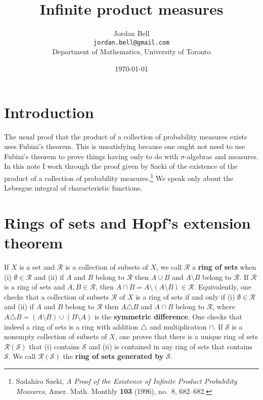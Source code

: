 \documentclass{article}
\theoremstyle{definition}
\begin{document}
\title{Infinite product measures}
\author{Jordan Bell\\ \texttt{jordan.bell@gmail.com}\\Department of Mathematics, University of Toronto}
\date{\today}

\maketitle

\section{Introduction}
The usual proof that the product of a collection of probability measures exists uses Fubini's theorem. This is unsatisfying because one ought not need to use Fubini's theorem
to prove things having only to do with $\sigma$-algebras and measures. In this note I work through the proof given by Saeki of the existence of the product of a collection
of probability measures.\footnote{Sadahiro Saeki, {\em A Proof of the Existence of Infinite Product Probability Measures}, Amer. Math. Monthly \textbf{103} (1996), no.~8, 682--682.}
 We  speak only about the Lebesgue integral of characteristic functions.

\section{Rings of sets and Hopf's extension theorem}
If $X$ is a set and $\mathscr{R}$ is a collection of subsets of $X$, we call $\mathscr{R}$ a \textbf{ring of sets} when
(i) $\emptyset \in \mathscr{R}$ and (ii) if $A$ and $B$ belong to $\mathscr{R}$ then $A \cup B$ and $A \setminus B$ belong to $\mathscr{R}$.
If $\mathscr{R}$ is a ring of sets and $A, B \in \mathscr{R}$, then $A \cap B = A \setminus (A \setminus B) \in \mathscr{R}$. Equivalently, one checks
that a collection of subsets $\mathscr{R}$ of $X$ is a ring of sets if and only if (i) $\emptyset \in \mathscr{R}$ and (ii) if
$A$ and $B$ belong to $\mathscr{R}$ then $A \triangle B$ and $A \cap B$ belong to $\mathscr{R}$, where
$A \triangle B = (A \setminus B) \cup (B \setminus A)$ is the \textbf{symmetric difference}. One checks that
indeed a ring of sets is a ring with addition $\triangle$ and multiplication $\cap$.
If $\mathscr{S}$ is a nonempty collection of subsets of $X$, one proves that there is a unique ring of sets $\mathscr{R}(\mathscr{S})$ 
that (i) contains $\mathscr{S}$  and (ii) is contained in any ring of sets that contains $\mathscr{S}$. We call $\mathscr{R}(\mathscr{S})$ the \textbf{ring
of sets generated by $\mathscr{S}$}.
\end{document}
